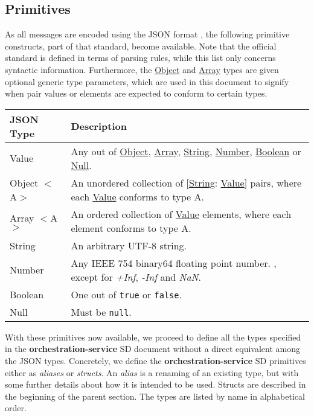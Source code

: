 \documentclass[a4paper]{arrowhead}
\newcommand{\pdef}[1]{{\textcolor{ArrowheadGrey}{#1 \label{sec:model:primitives:#1} \label{sec:model:primitives:#1s}}}}
\newcommand{\pref}[1]{{\textcolor{ArrowheadGrey}{\hyperref[sec:model:primitives:#1]{#1}}}}
\begin{document}
\subsection{Primitives}
\label{sec:model:primitives}

As all messages are encoded using the JSON format \cite{bray2014json}, the following primitive constructs, part of that standard, become available.
Note that the official standard is defined in terms of parsing rules, while this list only concerns syntactic information.
Furthermore, the \pref{Object} and \pref{Array} types are given optional generic type parameters, which are used in this document to signify when pair values or elements are expected to conform to certain types. 

\begin{table}[ht!]
\begin{tabularx}{\textwidth}{| p{3cm} | X |} \hline
\rowcolor{gray!33} JSON Type & Description \\ \hline
\pdef{Value}                 & Any out of \pref{Object}, \pref{Array}, \pref{String}, \pref{Number}, \pref{Boolean} or \pref{Null}. \\ \hline
\pdef{Object}$<$A$>$         & An unordered collection of $[$\pref{String}: \pref{Value}$]$ pairs, where each \pref{Value} conforms to type A. \\ \hline
\pdef{Array}$<$A$>$          & An ordered collection of \pref{Value} elements, where each element conforms to type A. \\ \hline
\pdef{String}                & An arbitrary UTF-8 string. \\ \hline
\pdef{Number}                & Any IEEE 754 binary64 floating point number. \cite{cowlishaw2019floating}, except for \textit{+Inf}, \textit{-Inf} and \textit{NaN}. \\ \hline
\pdef{Boolean}               & One out of \texttt{true} or \texttt{false}. \\ \hline
\pdef{Null}                  & Must be \texttt{null}. \\ \hline
\end{tabularx}
\end{table}

With these primitives now available, we proceed to define all the types specified in the \textbf{orchestration-service} SD document without a direct equivalent among the JSON types.
Concretely, we define the \textbf{orchestration-service} SD primitives either as \textit{aliases} or \textit{structs}.
An \textit{alias} is a renaming of an existing type, but with some further details about how it is intended to be used.
Structs are described in the beginning of the parent section.
The types are listed by name in alphabetical order.
\end{document}
